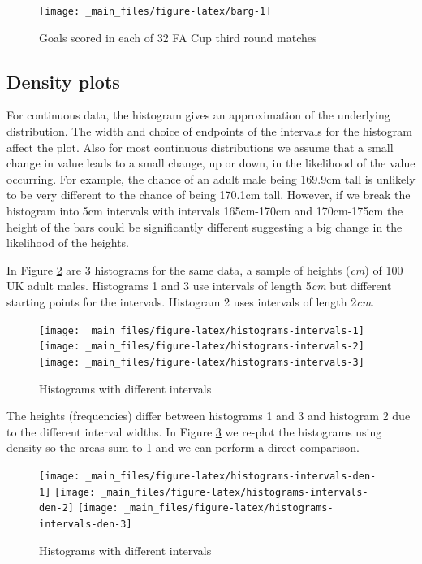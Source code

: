 \documentclass[
]{book}
\begin{document}
\begin{figure}
\texttt{[image: \_main\_files/figure-latex/barg-1]} \caption{Goals scored in each of 32 FA Cup third round matches}\label{fig:barg}
\end{figure}

\hypertarget{visual_plot_density}{%
\subsection{\texorpdfstring{{\textbf{Density plots}}}{Density plots}}\label{visual_plot_density}}

For continuous data, the histogram gives an approximation of the underlying distribution. The width and choice of endpoints of the intervals for the histogram affect the plot. Also for most continuous distributions we assume that a small change in value leads to a small change, up or down, in the likelihood of the value occurring. For example, the chance of an adult male being 169.9cm tall is unlikely to be very different to the chance of being 170.1cm tall. However, if we break the histogram into 5cm intervals with intervals 165cm-170cm and 170cm-175cm the height of the bars could be significantly different suggesting a big change in the likelihood of the heights.

In Figure \ref{fig:histograms-intervals} are 3 histograms for the same data, a sample of heights (\emph{cm}) of 100 UK adult males. Histograms 1 and 3 use intervals of length 5\emph{cm} but different starting points for the intervals. Histogram 2 uses intervals of length 2\emph{cm}.

\begin{figure}
\texttt{[image: \_main\_files/figure-latex/histograms-intervals-1]} \texttt{[image: \_main\_files/figure-latex/histograms-intervals-2]} \texttt{[image: \_main\_files/figure-latex/histograms-intervals-3]} \caption{Histograms with different intervals}\label{fig:histograms-intervals}
\end{figure}

The heights (frequencies) differ between histograms 1 and 3 and histogram 2 due to the different interval widths. In Figure \ref{fig:histograms-intervals-den} we re-plot the histograms using density so the areas sum to 1 and we can perform a direct comparison.

\begin{figure}
\texttt{[image: \_main\_files/figure-latex/histograms-intervals-den-1]} \texttt{[image: \_main\_files/figure-latex/histograms-intervals-den-2]} \texttt{[image: \_main\_files/figure-latex/histograms-intervals-den-3]} \caption{Histograms with different intervals}\label{fig:histograms-intervals-den}
\end{figure}
\end{document}
